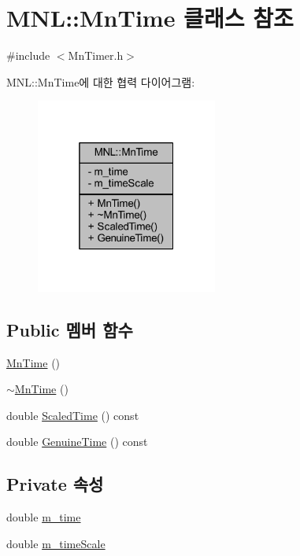 \hypertarget{class_m_n_l_1_1_mn_time}{}\section{M\+NL\+:\+:Mn\+Time 클래스 참조}
\label{class_m_n_l_1_1_mn_time}


{\ttfamily \#include $<$Mn\+Timer.\+h$>$}



M\+NL\+:\+:Mn\+Time에 대한 협력 다이어그램\+:\nopagebreak
\begin{figure}[H]
\begin{center}
\leavevmode
\includegraphics[width=169pt]{class_m_n_l_1_1_mn_time__coll__graph}
\end{center}
\end{figure}
\subsection*{Public 멤버 함수}
\begin{DoxyCompactItemize}
\item 
\hyperlink{class_m_n_l_1_1_mn_time_abe93779fd018a3655cc7f37065a8c373}{Mn\+Time} ()
\item 
\hyperlink{class_m_n_l_1_1_mn_time_ac3a57cc8d4e6c4259458911b1059c45f}{$\sim$\+Mn\+Time} ()
\item 
double \hyperlink{class_m_n_l_1_1_mn_time_a4466cc9011a917fe9b74c649eacc4399}{Scaled\+Time} () const
\item 
double \hyperlink{class_m_n_l_1_1_mn_time_a9ac81002c4fb2a297e2b132c80c5ee29}{Genuine\+Time} () const
\end{DoxyCompactItemize}
\subsection*{Private 속성}
\begin{DoxyCompactItemize}
\item 
double \hyperlink{class_m_n_l_1_1_mn_time_a35099377f11a843b6a7d33c9f5a97b09}{m\+\_\+time}
\item 
double \hyperlink{class_m_n_l_1_1_mn_time_a4ffb78e819ad4cb968f56824cba7b41c}{m\+\_\+time\+Scale}
\end{DoxyCompactItemize}
